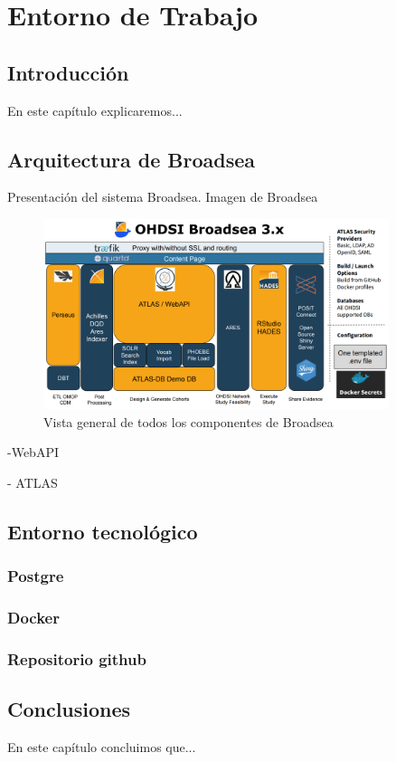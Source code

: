 \chapter{Entorno de Trabajo}\label{cap:07diseño}

\section{Introducción}
En este capítulo explicaremos...

\section{Arquitectura de Broadsea}

Presentación del sistema Broadsea. Imagen de Broadsea

\begin{figure}[H]
    \centering
    \includegraphics[width=0.90\textwidth]{figures/OHDSIBroadsea3.0.png}
    \caption{Vista general de todos los componentes de Broadsea}
    \label{fig:OHDSIBroadsea3.0}
\end{figure}

-{WebAPI}

- {ATLAS}

\section{Entorno tecnológico} %

\subsection{Postgre}

\subsection{Docker}

\subsection{Repositorio github}



\section{Conclusiones}
En este capítulo concluimos que...